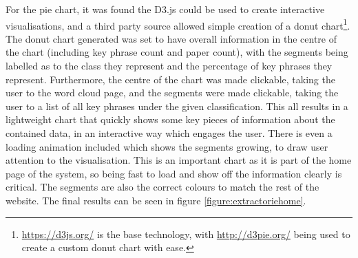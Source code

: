 For the pie chart, it was found the D3.js could be used to create interactive visualisations, and a third party source allowed simple creation of a donut chart\footnote{\href{https://d3js.org/}{https://d3js.org/} is the base technology, with \href{http://d3pie.org/}{http://d3pie.org/} being used to create a custom donut chart with ease.}. The donut chart generated was set to have overall information in the centre of the chart (including key phrase count and paper count), with the segments being labelled as to the class they represent and the percentage of key phrases they represent. Furthermore, the centre of the chart was made clickable, taking the user to the word cloud page, and the segments were made clickable, taking the user to a list of all key phrases under the given classification. This all results in a lightweight chart that quickly shows some key pieces of information about the contained data, in an interactive way which engages the user. There is even a loading animation included which shows the segments growing, to draw user attention to the visualisation. This is an important chart as it is part of the home page of the system, so being fast to load and show off the information clearly is critical. The segments are also the correct colours to match the rest of the website. The final results can be seen in figure \ref{figure:extractoriehome}.


